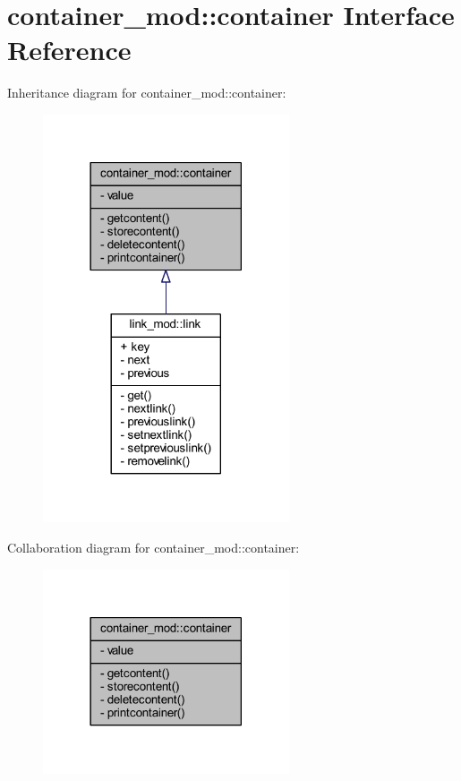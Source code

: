 \hypertarget{structcontainer__mod_1_1container}{}\section{container\+\_\+mod\+:\+:container Interface Reference}
\label{structcontainer__mod_1_1container}


Inheritance diagram for container\+\_\+mod\+:\+:container\+:
\nopagebreak
\begin{figure}[H]
\begin{center}
\leavevmode
\includegraphics[width=206pt]{structcontainer__mod_1_1container__inherit__graph}
\end{center}
\end{figure}


Collaboration diagram for container\+\_\+mod\+:\+:container\+:
\nopagebreak
\begin{figure}[H]
\begin{center}
\leavevmode
\includegraphics[width=206pt]{structcontainer__mod_1_1container__coll__graph}
\end{center}
\end{figure}
